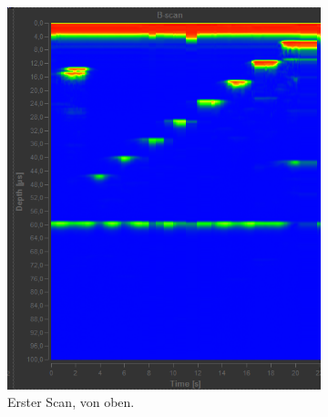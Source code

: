 \begin{figure}
  \centering
  \begin{subfigure}{0.48\textwidth}
    \centering
    \includegraphics[width=\textwidth]{daten/b/1.png}
    \caption{Erster Scan, von oben.}
    \label{fig:db1}
  \end{subfigure}
  \begin{subfigure}{0.48\textwidth}
    \centering

\end{subfigure}
\end{figure}
